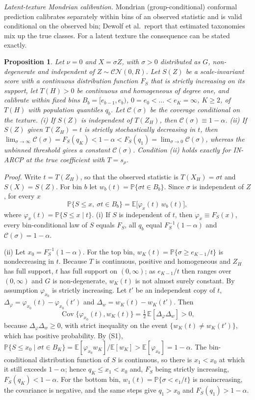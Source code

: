 \documentclass[10pt]{article}
\newtheorem{propS}{Proposition}
\begin{document}
\emph{Latent-texture Mondrian calibration.} Mondrian (group-conditional) conformal prediction calibrates separately within bins of an observed statistic and is valid conditional on the observed bin; Dewolf et al.\ report that estimated taxonomies mix up the true classes. For a latent texture the consequence can be stated exactly.
\begin{propS}\label{prop:mondrian}
Let $\nu=0$ and $X=\sigma Z$, with $\sigma>0$ distributed as $G$, non-degenerate and independent of $Z\sim\mathcal{CN}(0,R)$. Let $S(Z)$ be a scale-invariant score with a continuous distribution function $F_S$ that is strictly increasing on its support, let $T(H)>0$ be continuous and homogeneous of degree one, and calibrate within fixed bins $B_b=[e_{b-1},e_b)$, $0=e_0<\dots<e_K=\infty$, $K\ge2$, of $T(H)$ with population quantiles $q_b$. Let $\mathcal C(\sigma)$ be the coverage conditional on the texture.
(i) If $S(Z)$ is independent of $T(Z_H)$, then $\mathcal C(\sigma)\equiv1-\alpha$.
(ii) If $S(Z)$ given $T(Z_H)=t$ is strictly stochastically decreasing in $t$, then $\lim_{\sigma\to\infty}\mathcal C(\sigma)=F_S(q_K)<1-\alpha<F_S(q_1)=\lim_{\sigma\to0}\mathcal C(\sigma)$, whereas the unbinned threshold gives a constant $\mathcal C(\sigma)$. Condition (ii) holds exactly for IN-ARCP at the true coefficient with $T=s_\rho$.
\end{propS}
\emph{Proof.}
Write $t=T(Z_H)$, so that the observed statistic is $T(X_H)=\sigma t$ and $S(X)=S(Z)$. For bin $b$ let $w_b(t)=\mathbb{P}\{\sigma t\in B_b\}$. Since $\sigma$ is independent of $Z$, for every $x$
\begin{equation}
\mathbb{P}\{S\le x,\ \sigma t\in B_b\}=\mathbb E\big[\varphi_x(t)\,w_b(t)\big],
\tag{S1}
\end{equation}
where $\varphi_x(t)=\mathbb{P}\{S\le x\mid t\}$.
(i) If $S$ is independent of $t$, then $\varphi_x\equiv F_S(x)$, every bin-conditional law of $S$ equals $F_S$, all $q_b$ equal $F_S^{-1}(1-\alpha)$ and $\mathcal C(\sigma)=1-\alpha$.

(ii) Let $x_0=F_S^{-1}(1-\alpha)$. For the top bin, $w_K(t)=\mathbb{P}\{\sigma\ge e_{K-1}/t\}$ is nondecreasing in $t$. Because $T$ is continuous, positive and homogeneous and $Z_H$ has full support, $t$ has full support on $(0,\infty)$; as $e_{K-1}/t$ then ranges over $(0,\infty)$ and $G$ is non-degenerate, $w_K(t)$ is not almost surely constant. By assumption $\varphi_{x_0}$ is strictly increasing. Let $t'$ be an independent copy of $t$, $\Delta_\varphi=\varphi_{x_0}(t)-\varphi_{x_0}(t')$ and $\Delta_w=w_K(t)-w_K(t')$. Then
\[
\operatorname{Cov}\{\varphi_{x_0}(t),w_K(t)\}=\tfrac12\,\mathbb E[\Delta_\varphi\Delta_w]>0,
\]
because $\Delta_\varphi\Delta_w\ge0$, with strict inequality on the event $\{w_K(t)\ne w_K(t')\}$, which has positive probability. By (S1),
$\mathbb{P}\{S\le x_0\mid\sigma t\in B_K\}=\mathbb E[\varphi_{x_0}w_K]/\mathbb E[w_K]>\mathbb E[\varphi_{x_0}]=1-\alpha$.
The bin-conditional distribution function of $S$ is continuous, so there is $x_1<x_0$ at which it still exceeds $1-\alpha$; hence $q_K\le x_1<x_0$ and, $F_S$ being strictly increasing, $F_S(q_K)<1-\alpha$. For the bottom bin, $w_1(t)=\mathbb{P}\{\sigma<e_1/t\}$ is nonincreasing, the covariance is negative, and the same steps give $q_1>x_0$ and $F_S(q_1)>1-\alpha$.
\end{document}
